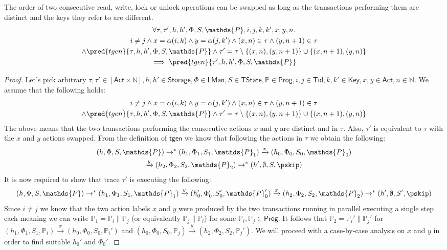 \lem \label{lem:rwlu} The order of two consecutive read, write, lock or unlock operations can be swapped as long as the transactions performing them are distinct and the keys they refer to are different.
\begin{gather*}
	\forall \tau, \tau', h, h', \Phi, S, \mathds{P}, i, j, k, k', x, y, n \ldotp \\
		i \neq j \land x = \alpha(i, k) \land y = \alpha(j, k') \land (x, n) \in \tau \land (y, n+1) \in \tau \\ \land \pred{tgen}{\tau, h, h', \Phi, S, \mathds{P}} \land \tau' = \tau \setminus \{(x, n), (y, n+1)\} \cup \{ (x, n+1), (y, n) \}
		\\	 
	 \implies \pred{tgen}{\tau', h, h', \Phi, S, \mathds{P}}
\end{gather*}
\begin{proof}
Let's pick arbitrary $\tau, \tau' \in [\mathsf{Act} \times \mathds{N}], h, h' \in \mathsf{Storage}, \Phi \in \mathsf{LMan}, S \in \mathsf{TState}, \mathds{P} \in \mathsf{Prog}, i, j \in \mathsf{Tid}, k, k' \in \mathsf{Key}, x, y \in \mathsf{Act}, n \in \mathds{N}$. We assume that the following holds:
\begin{gather}
	i \neq j \land x = \alpha(i, k) \land y = \alpha(j, k') \land (x, n) \in \tau \land (y, n+1) \in \tau \\ \land \pred{tgen}{\tau, h, h', \Phi, S, \mathds{P}} \land \tau' = \tau \setminus \{(x, n), (y, n+1)\} \cup \{ (x, n+1), (y, n) \}
\end{gather}
The above means that the two transactions performing the consecutive actions $x$ and $y$ are distinct and in $\tau$. Also, $\tau'$ is equivalent to $\tau$ with the $x$ and $y$ actions swapped. From the definition of $\mathsf{tgen}$ we know that following the actions in $\tau$ we obtain the following:
\begin{gather}
	\label{lem:xy1} (h, \Phi, S, \mathds{P}) \rightarrow^* (h_1, \Phi_1, S_1, \mathds{P}_1) \xrightarrow{x} (h_0, \Phi_0, S_0, \mathds{P}_0) \\
	\label{lem:xy2} \xrightarrow{y} (h_2, \Phi_2, S_2, \mathds{P}_2) \rightarrow^* (h', \emptyset, S, \pskip)
\end{gather}
It is now required to show that trace $\tau'$ is executing the following:
\[
	(h, \Phi, S, \mathds{P}) \rightarrow^* (h_1, \Phi_1, S_1, \mathds{P}_1) \xrightarrow{y} (h_0', \Phi_0', S_0', \mathds{P}_0') \xrightarrow{x} (h_2, \Phi_2, S_2, \mathds{P}_2) \rightarrow^* (h', \emptyset, S', \pskip)
\]
Since $i \neq j$ we know that the two action labels $x$ and $y$ were produced by the two transactions running in parallel executing a single step each meaning we can write $\mathds{P}_1 = \mathds{P}_i \| \mathds{P}_j$ (or equivalently $\mathds{P}_j \| \mathds{P}_i$) for some $\mathds{P}_i, \mathds{P}_j \in \mathsf{Prog}$. It follows that $\mathds{P}_2 = \mathds{P}_i' \| \mathds{P}_j'$ for $(h_1, \Phi_1, S_1, \mathds{P}_i) \xrightarrow{x} (h_0, \Phi_0, S_0, \mathds{P}_i')$ and $(h_0, \Phi_0, S_0, \mathds{P}_j) \xrightarrow{y} (h_2, \Phi_2, S_2, \mathds{P}_j')$. We will proceed with a case-by-case analysis on $x$ and $y$ in order to find suitable $h_0'$ and $\Phi_0'$.

\end{proof}
